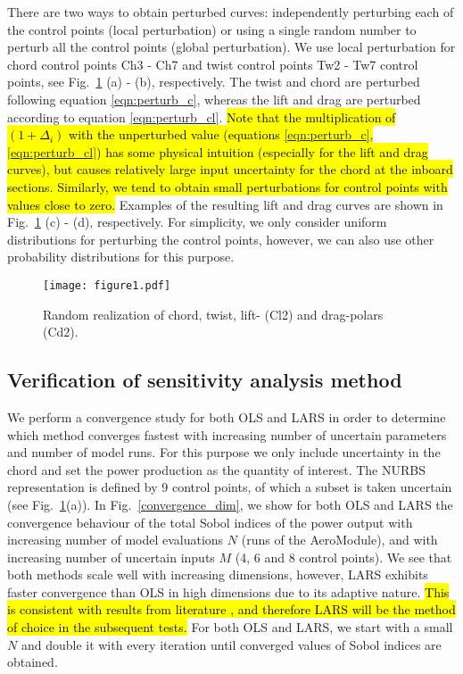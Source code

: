 There are two ways to obtain perturbed curves: independently perturbing each of the control points (local perturbation) or using a single random number to perturb all the control points (global perturbation). We use local perturbation for chord control points Ch3 - Ch7 and twist control points Tw2 - Tw7 control points, see Fig.\ \ref{perturbed_samples} (a) - (b), respectively. The twist and chord are perturbed following equation \eqref{eqn:perturb_c}, whereas the lift and drag are perturbed according to equation \eqref{eqn:perturb_cl}. \hl{Note that the multiplication of $(1+\Delta_i)$ with the unperturbed value (equations \eqref{eqn:perturb_c}, \eqref{eqn:perturb_cl}) has some physical intuition (especially for the lift and drag curves), but causes relatively large input uncertainty for the chord at the inboard sections. Similarly, we tend to obtain small perturbations for control points with values close to zero.} Examples of the resulting lift and drag curves are shown in Fig.\ \ref{perturbed_samples} (c) - (d), respectively. For simplicity, we only consider uniform distributions for perturbing the control points, however, we can also use other probability distributions for this purpose. 
\begin{figure}[ht!]
\centering
\texttt{[image: figure1.pdf]}
\caption{Random realization of chord, twist, lift- (Cl2) and drag-polars (Cd2).}
\label{perturbed_samples}
\end{figure}

\subsection{Verification of sensitivity analysis method}
We perform a convergence study for both OLS and LARS in order to determine which method converges fastest with increasing number of uncertain parameters and number of model runs. For this purpose we only include uncertainty in the chord and set the power production as the quantity of interest. The NURBS representation is defined by 9 control points, of which a subset is taken uncertain (see Fig.\ \ref{perturbed_samples}(a)). In Fig.\ \ref{convergence_dim}, we show for both OLS and LARS the convergence behaviour of the total Sobol indices of the power output with increasing number of model evaluations $N$ (runs of the AeroModule), and with increasing number of uncertain inputs $M$ (4, 6 and 8 control points). We see that both methods scale well with increasing dimensions, however, LARS exhibits faster convergence than OLS in high dimensions due to its adaptive nature. \hl{This is consistent with results from literature \cite{uqlab}, and therefore LARS will be the method of choice in the subsequent tests.} For both OLS and LARS, we start with a small $N$ and double it with every iteration until converged values of Sobol indices are obtained.

